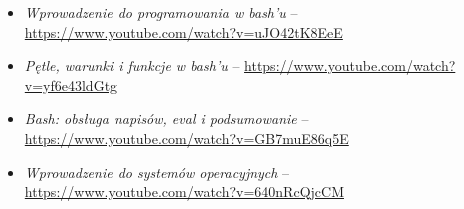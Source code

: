 % 
% 
% 
% 

\begin{itemize}
\item \emph{Wprowadzenie do programowania w bash'u} – \url{https://www.youtube.com/watch?v=uJO42tK8EeE}
\item \emph{Pętle, warunki i funkcje w bash'u} – \url{https://www.youtube.com/watch?v=yf6e43ldGtg}
\item \emph{Bash: obsługa napisów, eval i podsumowanie} – \url{https://www.youtube.com/watch?v=GB7muE86q5E}
\item \emph{Wprowadzenie do systemów operacyjnych} – \url{https://www.youtube.com/watch?v=640nRcQjcCM}
\end{itemize}
